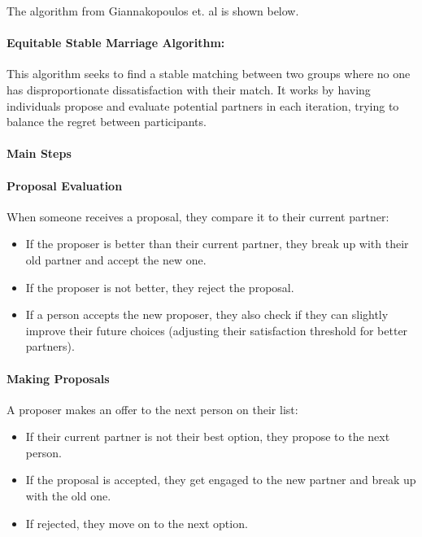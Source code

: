 The algorithm from Giannakopoulos et. al\cite{equitable} is shown below.

\paragraph{Equitable Stable Marriage Algorithm:}
This algorithm seeks to find a stable matching between two groups where no one has disproportionate dissatisfaction with their match. It works by having individuals propose and evaluate potential partners in each iteration, trying to balance the regret between participants.

\paragraph{Main Steps}

\paragraph{Proposal Evaluation}
When someone receives a proposal, they compare it to their current partner:
\begin{itemize}
    \item If the proposer is better than their current partner, they break up with their old partner and accept the new one.
    \item If the proposer is not better, they reject the proposal.
    \item If a person accepts the new proposer, they also check if they can slightly improve their future choices (adjusting their satisfaction threshold for better partners).
\end{itemize}

\paragraph{Making Proposals}
A proposer makes an offer to the next person on their list:
\begin{itemize}
    \item If their current partner is not their best option, they propose to the next person.
    \item If the proposal is accepted, they get engaged to the new partner and break up with the old one.
    \item If rejected, they move on to the next option.
\end{itemize}

